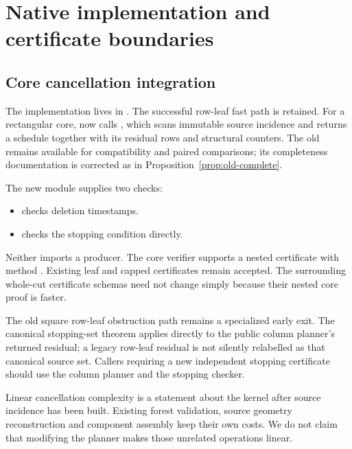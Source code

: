 \section{Native implementation and certificate boundaries}
\label{sec:implementation}

\subsection{Core cancellation integration}

The implementation lives in .
The successful row-leaf fast path is retained. For a rectangular core,
 now calls
, which scans immutable source incidence
and returns a schedule together with its residual rows and structural
counters. The old  remains available for
compatibility and paired comparisons; its completeness documentation is
corrected as in Proposition~\ref{prop:old-complete}.

The new module  supplies two checks:
\begin{itemize}
\item {} checks deletion timestamps.
\item {} checks the stopping
condition directly.
\end{itemize}
Neither imports a producer.
The core verifier supports a nested
 certificate with method
. Existing  leaf and
capped certificates remain accepted. The surrounding whole-cut certificate
schemas need not change simply because their nested core proof is faster.

The old square row-leaf obstruction path remains a specialized early exit.
The canonical stopping-set theorem applies directly to the public column
planner's returned residual; a legacy row-leaf residual is not silently
relabelled as that canonical source set. Callers requiring a new independent
stopping certificate should use the column planner and the stopping checker.

Linear cancellation complexity is a statement about the kernel after
source incidence has been built. Existing forest validation, source geometry
reconstruction and component assembly keep their own costs. We do not
claim that modifying the planner makes those unrelated operations linear.

